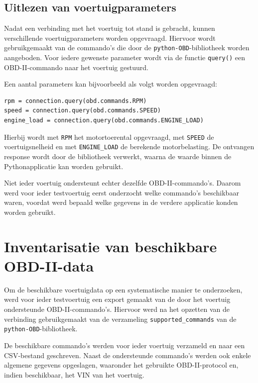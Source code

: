 \subsection{Uitlezen van voertuigparameters}
Nadat een verbinding met het voertuig tot stand is gebracht, kunnen
verschillende voertuigparameters worden opgevraagd. Hiervoor wordt gebruikgemaakt
van de commando's die door de \texttt{python-OBD}-bibliotheek worden aangeboden.
Voor iedere gewenste parameter wordt via de functie \texttt{query()} een
OBD-II-commando naar het voertuig gestuurd.

Een aantal parameters kan bijvoorbeeld als volgt worden opgevraagd:

\begin{listing}[H]
\begin{verbatim}
rpm = connection.query(obd.commands.RPM)
speed = connection.query(obd.commands.SPEED)
engine_load = connection.query(obd.commands.ENGINE_LOAD)
\end{verbatim}
\caption{Uitlezen van voertuigparameters via python-OBD}
\label{lst:obd-data-uitlezen}
\end{listing}

Hierbij wordt met \texttt{RPM} het motortoerental opgevraagd, met
\texttt{SPEED} de voertuigsnelheid en met \texttt{ENGINE\_LOAD} de berekende
motorbelasting. De ontvangen response wordt door de bibliotheek verwerkt,
waarna de waarde binnen de Pythonapplicatie kan worden gebruikt.

Niet ieder voertuig ondersteunt echter dezelfde OBD-II-commando's. Daarom werd
voor ieder testvoertuig eerst onderzocht welke commando's beschikbaar waren,
voordat werd bepaald welke gegevens in de verdere applicatie konden worden
gebruikt.

\section{Inventarisatie van beschikbare OBD-II-data}
Om de beschikbare voertuigdata op een systematische manier te onderzoeken,
werd voor ieder testvoertuig een export gemaakt van de door het voertuig
ondersteunde OBD-II-commando's. Hiervoor werd na het opzetten van de verbinding
gebruikgemaakt van de verzameling \texttt{supported\_commands} van de
\texttt{python-OBD}-bibliotheek.

De beschikbare commando's werden voor ieder voertuig verzameld en naar een
CSV-bestand geschreven. Naast de ondersteunde commando's werden ook enkele
algemene gegevens opgeslagen, waaronder het gebruikte OBD-II-protocol en,
indien beschikbaar, het VIN van het voertuig.

